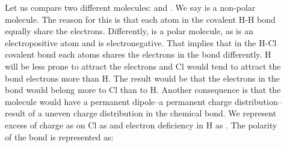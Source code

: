 \documentclass[main.tex]{subfiles}
\begin{document}
\sloppy 
\begin{description}
\item[] Let us compare two different molecules:  and . We say  is a non-polar molecule. The reason for this is that each atom in the covalent H-H bond equally share the electrons. Differently,  is a polar molecule, as  is an electropositive atom and  is electronegative. That implies that in the H-Cl covalent bond each atoms shares the electrons in the bond differently. H will be less prone to attract the electrons and Cl would tend to attract the bond electrons more than H. The result would be that the electrons in the bond would belong more to Cl than to H. Another consequence is that the molecule would have a permanent dipole--a permanent charge distribution--result of a uneven charge distribution in the chemical bond. We represent excess of charge as on Cl as \hspace{.05in} and electron deficiency in H as  . 
The polarity of the bond is represented as:
\begin{center}
\end{center}


\end{description}
\end{document}
